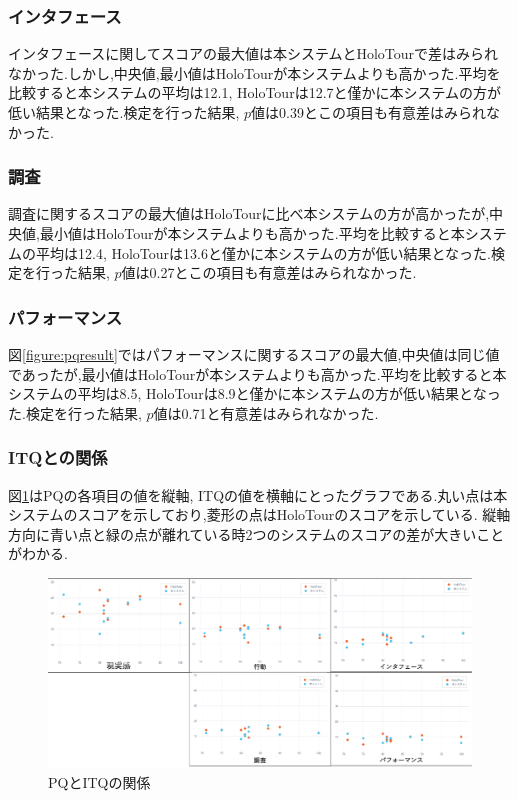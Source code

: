\subsubsection{インタフェース}
インタフェースに関してスコアの最大値は本システムとHoloTourで差はみられなかった.しかし,中央値,最小値はHoloTourが本システムよりも高かった.平均を比較すると本システムの平均は12.1, HoloTourは12.7と僅かに本システムの方が低い結果となった.検定を行った結果, $p$値は0.39とこの項目も有意差はみられなかった.

\subsubsection{調査}
調査に関するスコアの最大値はHoloTourに比べ本システムの方が高かったが,中央値,最小値はHoloTourが本システムよりも高かった.平均を比較すると本システムの平均は12.4, HoloTourは13.6と僅かに本システムの方が低い結果となった.検定を行った結果, $p$値は0.27とこの項目も有意差はみられなかった.

\subsubsection{パフォーマンス}
図\ref{figure:pqresult}ではパフォーマンスに関するスコアの最大値,中央値は同じ値であったが,最小値はHoloTourが本システムよりも高かった.平均を比較すると本システムの平均は8.5, HoloTourは8.9と僅かに本システムの方が低い結果となった.検定を行った結果, $p$値は0.71と有意差はみられなかった.

\subsubsection{ITQとの関係}
図\ref{figure:ITQresult}はPQの各項目の値を縦軸, ITQの値を横軸にとったグラフである.丸い点は本システムのスコアを示しており,菱形の点はHoloTourのスコアを示している.
縦軸方向に青い点と緑の点が離れている時2つのシステムのスコアの差が大きいことがわかる.

\begin{figure}[t]
\begin{center}
\includegraphics[width=17cm]{img/05_evaluate/ITQresult.eps} 
\end{center}
\caption{PQとITQの関係}
\label{figure:ITQresult}
\end{figure} 

